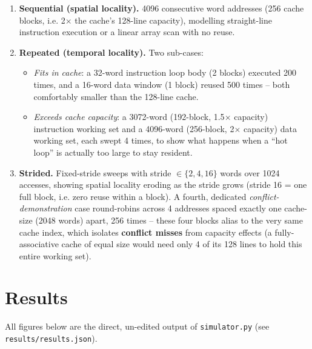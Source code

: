 \documentclass[11pt]{article}
\begin{document}
\begin{enumerate}[leftmargin=1.6em]
\item \textbf{Sequential (spatial locality).} 4096 consecutive word
      addresses (256 cache blocks, i.e. 2$\times$ the cache's 128-line
      capacity), modelling straight-line instruction execution or a
      linear array scan with no reuse.

\item \textbf{Repeated (temporal locality).} Two sub-cases:
      \begin{itemize}
        \item \emph{Fits in cache}: a 32-word instruction loop body
              (2 blocks) executed 200 times, and a 16-word data
              window (1 block) reused 500 times -- both comfortably
              smaller than the 128-line cache.
        \item \emph{Exceeds cache capacity}: a 3072-word (192-block,
              1.5$\times$ capacity) instruction working set and a
              4096-word (256-block, 2$\times$ capacity) data working
              set, each swept 4 times, to show what happens when a
              ``hot loop'' is actually too large to stay resident.
      \end{itemize}

\item \textbf{Strided.} Fixed-stride sweeps with stride
      $\in\{2,4,16\}$ words over 1024 accesses, showing spatial
      locality eroding as the stride grows (stride 16 = one full
      block, i.e. zero reuse within a block). A fourth, dedicated
      \emph{conflict-demonstration} case round-robins across 4
      addresses spaced exactly one cache-size (2048 words) apart, 256
      times -- these four blocks alias to the very same cache index,
      which isolates \textbf{conflict misses} from capacity effects
      (a fully-associative cache of equal size would need only 4 of
      its 128 lines to hold this entire working set).
\end{enumerate}

\section{Results}

All figures below are the direct, un-edited output of
\texttt{simulator.py} (see \texttt{results/results.json}).
\end{document}
